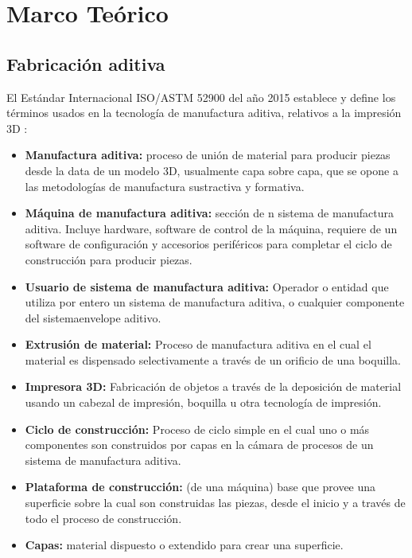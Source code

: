 

\chapter{Marco Te\'orico}
\label{cap:preliminares}



\section{Fabricación aditiva}

El Estándar Internacional ISO/ASTM 52900 del año 2015 establece y define los términos usados en la tecnología de manufactura aditiva, relativos a la impresión 3D \citep{iso2015}:

\begin{itemize}
\item \textbf{Manufactura aditiva:} proceso de unión de material para producir piezas desde la data de un modelo 3D, usualmente capa sobre capa, que se opone a las metodologías de manufactura sustractiva y formativa.
\item \textbf{Máquina de manufactura aditiva:} sección de n sistema de manufactura aditiva. Incluye hardware, software de control de la máquina, requiere de un software de configuración y accesorios periféricos para completar el ciclo de construcción para producir piezas.
\item \textbf{Usuario de sistema de manufactura aditiva:} Operador o entidad que utiliza por entero un sistema de manufactura aditiva, o cualquier componente del sistemaenvelope aditivo.
\item \textbf{Extrusión de material:} Proceso de manufactura aditiva en el cual el material es dispensado selectivamente a través de un orificio de una boquilla. 
\item \textbf{Impresora 3D:} Fabricación de objetos a través de la deposición de material usando un cabezal de impresión, boquilla u otra tecnología de impresión.
\item \textbf{Ciclo de construcción:}  Proceso de ciclo simple en el cual uno o más componentes son construidos por capas en la cámara de procesos de un sistema de manufactura aditiva.
\item \textbf{Plataforma de construcción:} (de una máquina) base que provee una superficie sobre la cual son construidas las piezas, desde el inicio y a través de todo el proceso de construcción.
\item \textbf{Capas: } material dispuesto o extendido para crear una superficie.

\end{itemize}
